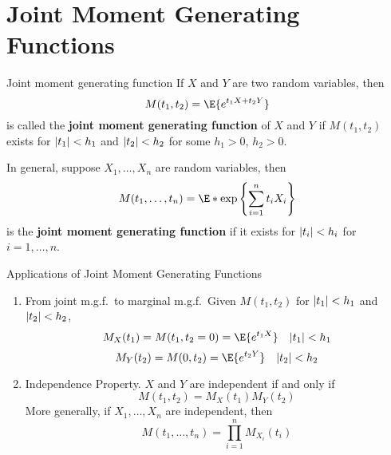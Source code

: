 \section{Joint Moment Generating Functions}
\begin{Definition}{Joint moment generating function}{}
    If $ X $ and $ Y $ are two random variables, then
    \[ M(t_1,t_2)=\E{e^{t_1X+t_2Y}} \]
    is called the \textbf{joint moment generating function}
    of $ X $ and $ Y $ if $ M(t_1,t_2) $ exists for
    $ \lvert t_1\rvert<h_1 $ and $ \lvert t_2\rvert<h_2 $
    for some $ h_1>0 $, $ h_2>0 $.
\end{Definition}
\begin{Remark}{}{}
    In general, suppose $ X_1,\ldots,X_n $ are random variables,
    then
    \[ M(t_1,\ldots,t_n)=\E*{\exp\left\{ \sum_{i=1}^{n} t_i X_i\right\}} \]
    is the \textbf{joint moment generating function}
    if it exists for $ \lvert t_i\rvert<h_i $ for $ i=1,\ldots,n $.
\end{Remark}
\begin{Remark}{Applications of Joint Moment Generating Functions}{}
    \begin{enumerate}[label=(\arabic*)]
        \item From joint m.g.f.\ to marginal m.g.f.\
              Given $ M(t_1,t_2) $ for $ \lvert t_1\rvert<h_1 $
              and $ \lvert t_2\rvert<h_2 $,
              \[ M_X(t_1)=M(t_1,t_2=0)=\E{e^{t_1X}}\quad \abs{t_1}<h_1 \]
              \[ M_Y(t_2)=M(0,t_2)=\E{e^{t_2Y}}\quad \abs{t_2}<h_2 \]
        \item Independence Property. $ X $ and
              $ Y $ are independent if and only if
              \[ M(t_1,t_2)=M_X(t_1)M_Y(t_2) \]
              More generally, if $ X_1,\ldots,X_n $ are
              independent, then
              \[ M(t_1,\ldots,t_n)=\prod_{i=1}^n M_{X_i}(t_i) \]
    \end{enumerate}
\end{Remark}
